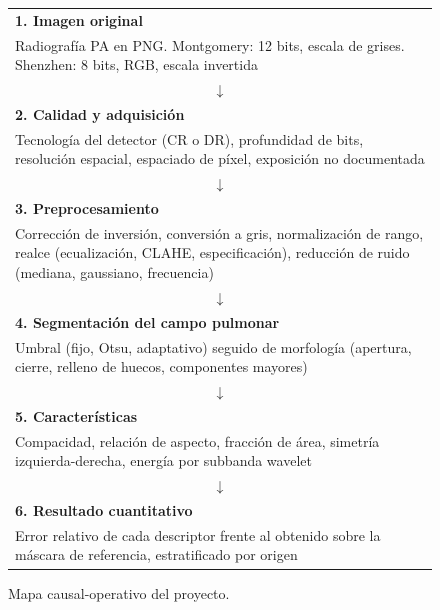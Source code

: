 \documentclass[12pt,a4paper]{article}
\begin{document}
\begin{figure}[H]
\centering
\small
\begin{tabular}{|p{4.6cm}|}
\hline
\textbf{1. Imagen original} \\
Radiografía PA en PNG. Montgomery: 12 bits, escala de grises. Shenzhen: 8 bits, RGB, escala invertida \\
\hline
\multicolumn{1}{c}{$\downarrow$} \\
\hline
\textbf{2. Calidad y adquisición} \\
Tecnología del detector (CR o DR), profundidad de bits, resolución espacial, espaciado de píxel, exposición no documentada \\
\hline
\multicolumn{1}{c}{$\downarrow$} \\
\hline
\textbf{3. Preprocesamiento} \\
Corrección de inversión, conversión a gris, normalización de rango, realce (ecualización, CLAHE, especificación), reducción de ruido (mediana, gaussiano, frecuencia) \\
\hline
\multicolumn{1}{c}{$\downarrow$} \\
\hline
\textbf{4. Segmentación del campo pulmonar} \\
Umbral (fijo, Otsu, adaptativo) seguido de morfología (apertura, cierre, relleno de huecos, componentes mayores) \\
\hline
\multicolumn{1}{c}{$\downarrow$} \\
\hline
\textbf{5. Características} \\
Compacidad, relación de aspecto, fracción de área, simetría izquierda-derecha, energía por subbanda wavelet \\
\hline
\multicolumn{1}{c}{$\downarrow$} \\
\hline
\textbf{6. Resultado cuantitativo} \\
Error relativo de cada descriptor frente al obtenido sobre la máscara de referencia, estratificado por origen \\
\hline
\end{tabular}
\caption{Mapa causal-operativo del proyecto.}
\end{figure}
\end{document}
